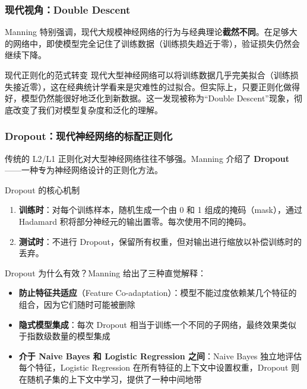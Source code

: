\documentclass[a4paper]{article}
\begin{document}



\subsubsection{现代视角：Double Descent}

Manning 特别强调，现代大规模神经网络的行为与经典理论\textbf{截然不同}。在足够大的网络中，即使模型完全记住了训练数据（训练损失趋近于零），验证损失仍然会继续下降。

\begin{importantbox}{现代正则化的范式转变}
现代大型神经网络可以将训练数据几乎完美拟合（训练损失接近零），这在经典统计学看来是灾难性的过拟合。但实际上，只要正则化做得好，模型仍然能很好地泛化到新数据。这一发现被称为``Double Descent''现象，彻底改变了我们对模型复杂度和泛化的理解。
\end{importantbox}





\subsubsection{Dropout：现代神经网络的标配正则化}

传统的 L2/L1 正则化对大型神经网络往往不够强。Manning 介绍了 \textbf{Dropout}——一种专为神经网络设计的正则化方法。





\begin{importantbox}{Dropout 的核心机制}
\begin{enumerate}
    \item \textbf{训练时}：对每个训练样本，随机生成一个由 0 和 1 组成的掩码（mask），通过 Hadamard 积将部分神经元的输出置零。每次使用不同的掩码。
    \item \textbf{测试时}：不进行 Dropout，保留所有权重，但对输出进行缩放以补偿训练时的丢弃。
\end{enumerate}
\end{importantbox}

Dropout 为什么有效？Manning 给出了三种直觉解释：

\begin{itemize}
    \item \textbf{防止特征共适应}（Feature Co-adaptation）：模型不能过度依赖某几个特征的组合，因为它们随时可能被删除
    \item \textbf{隐式模型集成}：每次 Dropout 相当于训练一个不同的子网络，最终效果类似于指数级数量的模型集成
    \item \textbf{介于 Naive Bayes 和 Logistic Regression 之间}：Naive Bayes 独立地评估每个特征，Logistic Regression 在所有特征的上下文中设置权重，Dropout 则在随机子集的上下文中学习，提供了一种中间地带
\end{itemize}
\end{document}
